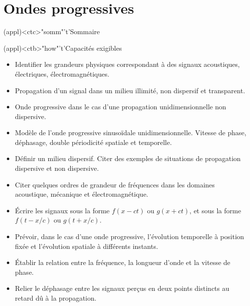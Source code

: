 \documentclass[../../main/main.tex]{subfiles}
\begin{document}
\setcounter{chapter}{0}


\chapter{Ondes progressives}

\vspace*{\fill}

\begin{tcn}(appl)<ctc>"somm"'t'{Sommaire}
	\let\item\olditem
	\vspace{-15pt}
	\minitoc
	\vspace{-25pt}
\end{tcn}

\begin{tcn}[sidebyside,
		fontupper=\footnotesize, fontlower=\footnotesize
	](appl)<ctb>"how"'t'{Capacités exigibles}
	\begin{itemize}[label=\rcheck]
		\item Identifier les grandeurs physiques correspondant à
		      des signaux acoustiques, électriques, électromagnétiques.
		\item Propagation d'un signal dans un milieu illimité, non dispersif et
		      transparent.
		\item Onde progressive dans le cas d'une propagation unidimensionnelle non
		      dispersive.
		\item Modèle de l'onde progressive sinusoïdale unidimensionnelle. Vitesse
		      de phase, déphasage, double périodicité spatiale et temporelle.
		\item Définir un milieu dispersif. Citer des exemples de situations de
		      propagation dispersive et non dispersive.
	\end{itemize}
	\tcblower
	\begin{itemize}[label=\rcheck]
		\item Citer quelques ordres de grandeur de fréquences dans les domaines
		      acoustique, mécanique et électromagnétique.
		\item Écrire les signaux sous la forme $f(x-ct)$ ou $g(x+ct)$, et
		      sous la forme $f(t-x/c)$ ou $g(t+x/c)$.
		\item Prévoir, dans le cas d'une onde progressive, l'évolution temporelle
		      à position fixée et l'évolution spatiale à différents instants.
		\item Établir la relation entre la fréquence, la longueur d'onde et la
		      vitesse de phase.
		\item Relier le déphasage entre les signaux perçus en deux points
		      distincts au retard dû à la propagation.
	\end{itemize}
\end{tcn}
\end{document}
